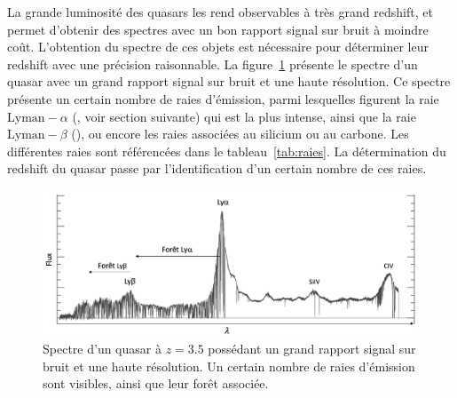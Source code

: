 La grande luminosité des quasars les rend observables à très grand redshift, et permet d'obtenir des spectres avec un bon rapport signal sur bruit à moindre coût. L'obtention du spectre de ces objets est nécessaire pour déterminer leur redshift avec une précision raisonnable. La figure~\ref{fig:spectre_qso} présente le spectre d'un quasar avec un grand rapport signal sur bruit et une haute résolution. Ce spectre présente un certain nombre de raies d'émission, parmi lesquelles figurent la raie $\mathrm{Lyman-}\alpha$ (\lya{}, voir section suivante) qui est la plus intense, ainsi que la raie $\mathrm{Lyman-}\beta$ (\lyb{}), ou encore les raies associées au silicium ou au carbone. Les différentes raies sont référencées dans le tableau~\ref{tab:raies}. La détermination du redshift du quasar passe par l'identification d'un certain nombre de ces raies.
\begin{figure}
  \centering
  \includegraphics[scale=0.4]{spectre_qso}
  \caption{Spectre d'un quasar à $z = 3.5$ possédant un grand rapport signal sur bruit et une haute résolution. Un certain nombre de raies d'émission sont visibles, ainsi que leur forêt associée.}
  \label{fig:spectre_qso}
\end{figure}
